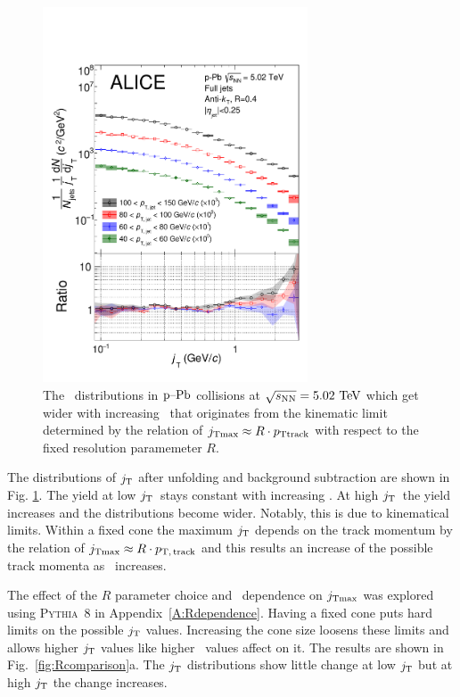 \begin{figure}[h]
  \begin{center}
  \includegraphics[width=0.7\textwidth]{newfigures/jTwithSystematics.pdf}
  \caption{The \jt\ distributions in $\mbox{p--Pb}$ collisions at $\sqrt{s_{\mathrm{NN}}} = 5.02~\mathrm{TeV}$ which get wider with increasing \ptjet\ that originates from the kinematic limit determined by the relation of $j_{\rm Tmax} \approx R \cdot p_{\rm Ttrack}$ with respect to the fixed resolution paramemeter $R$.}
  \label{fig:jt_systematics}
  \end{center}
  \end{figure}

The distributions of $j_{\rm T}$ after unfolding and background subtraction are shown in Fig. \ref{fig:jt_systematics}.
The yield at low $j_{\rm T}$ stays constant with increasing \ptjet. At high $j_{\rm T}$ the yield increases and the distributions become wider. Notably, this is due to kinematical limits. Within a fixed cone the maximum $j_{\rm T}$ depends on the track momentum by the relation of $j_{\rm Tmax} \approx R \cdot p_\mathrm{T,\,track}$ and this results an increase of the possible track momenta as \ptjet\ increases.

The effect of the $R$ parameter choice and \ptjet\ dependence on $j_{\rm Tmax}$ was explored using \textsc{Pythia}~8 in Appendix~\ref{A:Rdependence}. Having a fixed cone puts hard limits on the possible $j_{\rm T}$ values. Increasing the cone size loosens these limits and allows higher $j_{\rm T}$ values like higher \ptjet\ values affect on it. The results are shown in Fig.~\ref{fig:Rcomparison}a. The $j_{\rm T}$ distributions show little change at low $j_{\rm T}$ but at high $j_{\rm T}$ the change increases.  
  

